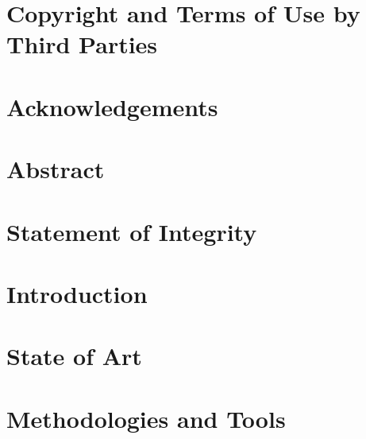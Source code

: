 \documentclass[a4paper,11pt]{article}
\begin{document}
    




\pagebreak






\setcounter{secnumdepth}{-1}



\section*{Copyright and Terms of Use by Third Parties}


\section*{Acknowledgements}


\section*{Abstract}


\section*{Statement of Integrity}


\renewcommand{\contentsname}{Contents}        %
\tableofcontents
\newpage




\setcounter{secnumdepth}{3}
\pagebreak


\section{Introduction}





\section{State of Art}




\section{Methodologies and Tools}

\end{document}
